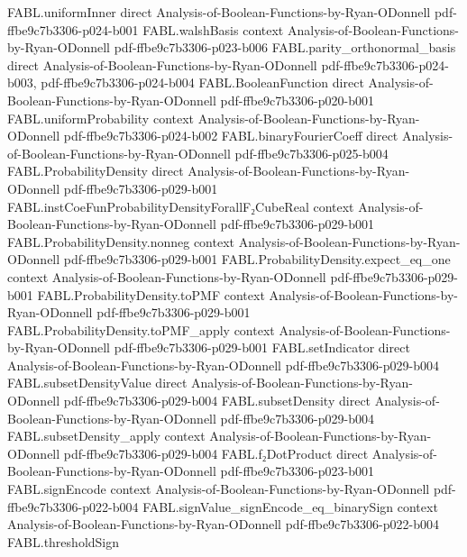\begin{theorem}
  {FABL.uniformInner}
  {direct}
  {Analysis-of-Boolean-Functions-by-Ryan-ODonnell}
  {pdf-ffbe9c7b3306-p024-b001}
\proofstep
  {FABL.walshBasis}
  {context}
  {Analysis-of-Boolean-Functions-by-Ryan-ODonnell}
  {pdf-ffbe9c7b3306-p023-b006}
\proofstep
  {FABL.parity_orthonormal_basis}
  {direct}
  {Analysis-of-Boolean-Functions-by-Ryan-ODonnell}
  {pdf-ffbe9c7b3306-p024-b003,
    pdf-ffbe9c7b3306-p024-b004}
\proofstep
  {FABL.BooleanFunction}
  {direct}
  {Analysis-of-Boolean-Functions-by-Ryan-ODonnell}
  {pdf-ffbe9c7b3306-p020-b001}
\proofstep
  {FABL.uniformProbability}
  {context}
  {Analysis-of-Boolean-Functions-by-Ryan-ODonnell}
  {pdf-ffbe9c7b3306-p024-b002}
\proofstep
  {FABL.binaryFourierCoeff}
  {direct}
  {Analysis-of-Boolean-Functions-by-Ryan-ODonnell}
  {pdf-ffbe9c7b3306-p025-b004}
\proofstep
  {FABL.ProbabilityDensity}
  {direct}
  {Analysis-of-Boolean-Functions-by-Ryan-ODonnell}
  {pdf-ffbe9c7b3306-p029-b001}
\proofstep
  {FABL.instCoeFunProbabilityDensityForallF₂CubeReal}
  {context}
  {Analysis-of-Boolean-Functions-by-Ryan-ODonnell}
  {pdf-ffbe9c7b3306-p029-b001}
\proofstep
  {FABL.ProbabilityDensity.nonneg}
  {context}
  {Analysis-of-Boolean-Functions-by-Ryan-ODonnell}
  {pdf-ffbe9c7b3306-p029-b001}
\proofstep
  {FABL.ProbabilityDensity.expect_eq_one}
  {context}
  {Analysis-of-Boolean-Functions-by-Ryan-ODonnell}
  {pdf-ffbe9c7b3306-p029-b001}
\proofstep
  {FABL.ProbabilityDensity.toPMF}
  {context}
  {Analysis-of-Boolean-Functions-by-Ryan-ODonnell}
  {pdf-ffbe9c7b3306-p029-b001}
\proofstep
  {FABL.ProbabilityDensity.toPMF_apply}
  {context}
  {Analysis-of-Boolean-Functions-by-Ryan-ODonnell}
  {pdf-ffbe9c7b3306-p029-b001}
\proofstep
  {FABL.setIndicator}
  {direct}
  {Analysis-of-Boolean-Functions-by-Ryan-ODonnell}
  {pdf-ffbe9c7b3306-p029-b004}
\proofstep
  {FABL.subsetDensityValue}
  {direct}
  {Analysis-of-Boolean-Functions-by-Ryan-ODonnell}
  {pdf-ffbe9c7b3306-p029-b004}
\proofstep
  {FABL.subsetDensity}
  {direct}
  {Analysis-of-Boolean-Functions-by-Ryan-ODonnell}
  {pdf-ffbe9c7b3306-p029-b004}
\proofstep
  {FABL.subsetDensity_apply}
  {context}
  {Analysis-of-Boolean-Functions-by-Ryan-ODonnell}
  {pdf-ffbe9c7b3306-p029-b004}
\proofstep
  {FABL.f₂DotProduct}
  {direct}
  {Analysis-of-Boolean-Functions-by-Ryan-ODonnell}
  {pdf-ffbe9c7b3306-p023-b001}
\proofstep
  {FABL.signEncode}
  {context}
  {Analysis-of-Boolean-Functions-by-Ryan-ODonnell}
  {pdf-ffbe9c7b3306-p022-b004}
\proofstep
  {FABL.signValue_signEncode_eq_binarySign}
  {context}
  {Analysis-of-Boolean-Functions-by-Ryan-ODonnell}
  {pdf-ffbe9c7b3306-p022-b004}
\proofstep
  {FABL.thresholdSign}

\end{theorem}
